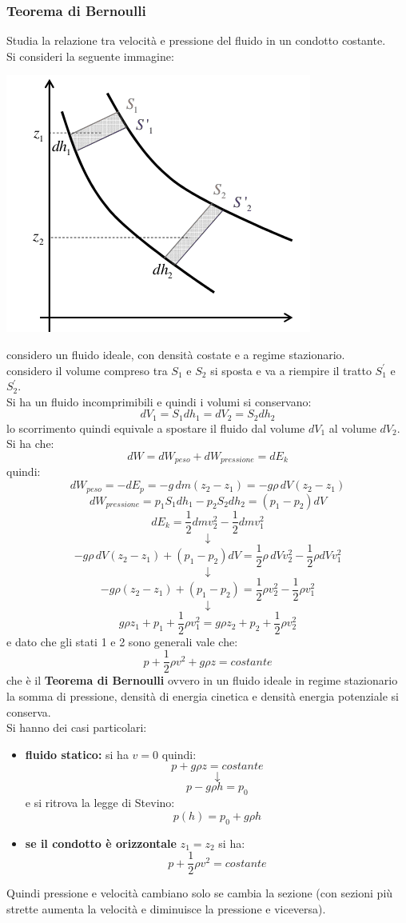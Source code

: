 \documentclass[a4paper,12pt, oneside]{book}
\begin{document}
\subsubsection{Teorema di Bernoulli}
Studia la relazione tra velocità e pressione del fluido in un condotto costante.\\
Si consideri la seguente immagine:
\begin{center}
\includegraphics[scale=0.7]{img/flu6.png}
\end{center}
considero un fluido ideale, con densità costate e a regime stazionario.\\
considero il volume compreso tra $S_1$ e $S_2$ si sposta e va a riempire il tratto $S_1^{'}$ e $S_2^{'}$.\\
Si ha un fluido incomprimibili e quindi i volumi si conservano:
$$dV_1=S_1dh_1=dV_2=S_2dh_2$$
lo scorrimento quindi equivale a spostare il fluido dal volume $dV_1$ al volume $dV_2$.\\
Si ha che:
$$dW=dW_{peso}+dW_{pressione}=dE_k$$
quindi:
$$dW_{peso}=-dE_p=-g\,dm(z_2-z_1)=-g\rho\,dV(z_2-z_1)$$
$$dW_{pressione}=p_1S_1dh_1-p_2S_2dh_2=(p_1-p_2)dV$$
$$dE_k=\frac{1}{2}dmv_2^2-\frac{1}{2}dmv_1^2$$
$$\downarrow$$
$$-g\rho\,dV(z_2-z_1)+(p_1-p_2)dV=\frac{1}{2}\rho\,dVv_2^2-\frac{1}{2}\rho dVv_1^2$$
$$\downarrow$$
$$-g\rho(z_2-z_1)+(p_1-p_2)=\frac{1}{2}\rho v_2^2-\frac{1}{2}\rho v_1^2$$
$$\downarrow$$
$$g\rho z_1+p_1+\frac{1}{2}\rho v_1^2=g\rho z_2+p_2+\frac{1}{2}\rho v_2^2$$
e dato che gli stati 1 e 2 sono generali vale che:
$$p+\frac{1}{2}\rho v^2+g\rho z=costante$$
che è il \textbf{Teorema di Bernoulli} ovvero in un fluido ideale in regime stazionario 	la somma di pressione, densità di energia cinetica e densità energia potenziale si conserva.\\
Si hanno dei casi particolari:
\begin{itemize}
\item \textbf{fluido statico:} si ha $v=0$ quindi:
$$p+g\rho z=costante$$
$$\downarrow$$
$$p-g\rho h=p_0$$
e si ritrova la legge di Stevino:
$$p(h)=p_0+g\rho h$$
\item \textbf{se il condotto è orizzontale} $z_1=z_2$ si ha:
$$p+\frac{1}{2}\rho v^2=costante$$
\end{itemize}
Quindi pressione e velocità cambiano solo se cambia la sezione (con sezioni più strette aumenta la velocità e diminuisce la pressione e viceversa).
\end{document}
